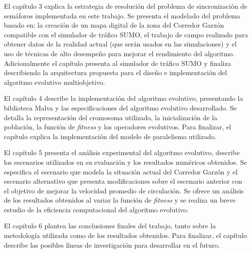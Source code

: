 El capítulo 3 explica la estrategia de resolución del problema de sincronización de semáforos implementada en este trabajo. Se presenta el modelado del problema basado en: la creación de un mapa digital de la zona del Corredor Garzón compatible con el simulador de tráfico SUMO, el trabajo de campo realizado para obtener datos de la realidad actual (que serán usados en las simulaciones) y el uso de técnicas de alto desempeño para mejorar el rendimiento del algoritmo. Adicionalmente el capítulo presenta al simulador de tráfico SUMO y finaliza describiendo la arquitectura propuesta para el diseño e implementación del algoritmo evolutivo multiobjetivo.

El capítulo 4 describe la implementación del algoritmo evolutivo, presentando la biblioteca Malva y las especificaciones del algoritmo evolutivo desarrollado. Se detalla la representación del cromosoma utilizado, la inicialización de la población, la función de \emph{fitness} y los operadores evolutivos. Para finalizar, el capítulo explica la implementación del modelo de paralelismo utilizado.


El capítulo 5 presenta el análisis experimental del algoritmo evolutivo, describe los escenarios utilizados en su evaluación y los resultados numéricos obtenidos. Se especifica el escenario que modela la situación actual del Corredor Garzón y el escenario alternativo que presenta modificaciones sobre el escenario anterior con el objetivo de mejorar la velocidad promedio de circulación. Se ofrece un análisis de los resultados obtenidos al variar la función de \emph{fitness} y se realiza un breve estudio de la eficiencia computacional del algoritmo evolutivo.

El capítulo 6 plantea las conclusiones finales del trabajo, tanto sobre la metodología utilizada como de los resultados obtenidos. Para finalizar, el capítulo describe las posibles líneas de investigación para desarrollar en el futuro.






